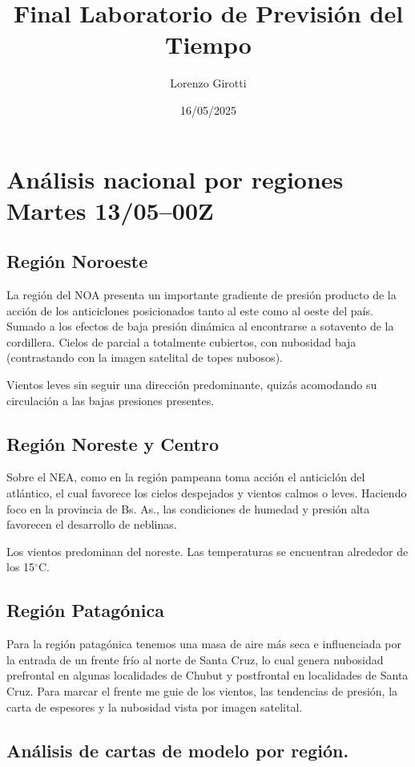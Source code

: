 \documentclass{article}
\title{Final Laboratorio de Previsión del Tiempo}
\author{Lorenzo Girotti}
\date{16/05/2025}
\begin{document}
\maketitle
\section{Análisis nacional por regiones Martes 13/05--00Z}
\subsection{Región Noroeste}
La región del NOA presenta un importante gradiente de presión producto de la acción de los anticiclones 
posicionados tanto al este como al oeste del país. Sumado a los efectos de baja presión dinámica al encontrarse a sotavento 
de la cordillera. Cielos de parcial a totalmente cubiertos, con nubosidad baja 
(contrastando con la imagen satelital de topes nubosos).

Vientos leves sin seguir una dirección predominante, quizás acomodando su circulación a las bajas presiones presentes.

\subsection{Región Noreste y Centro}
Sobre el NEA, como en la región pampeana toma acción el anticiclón del atlántico, el cual favorece los cielos despejados y 
vientos calmos o leves. Haciendo foco en la provincia de Bs. As., las condiciones de humedad y presión alta favorecen el 
desarrollo de neblinas.

Los vientos predominan del noreste. Las temperaturas se encuentran alrededor de los 15$^\circ$C.

\subsection{Región Patagónica}
Para la región patagónica tenemos una masa de aire más seca e influenciada por la entrada de un frente frío al norte de Santa Cruz,
lo cual genera nubosidad prefrontal en algunas localidades de Chubut y postfrontal en localidades de Santa Cruz. Para marcar el 
frente me guie de los vientos, las tendencias de presión,  la carta de espesores y la nubosidad vista por imagen satelital.

\subsection{Análisis de cartas de modelo por región.}
\end{document}

